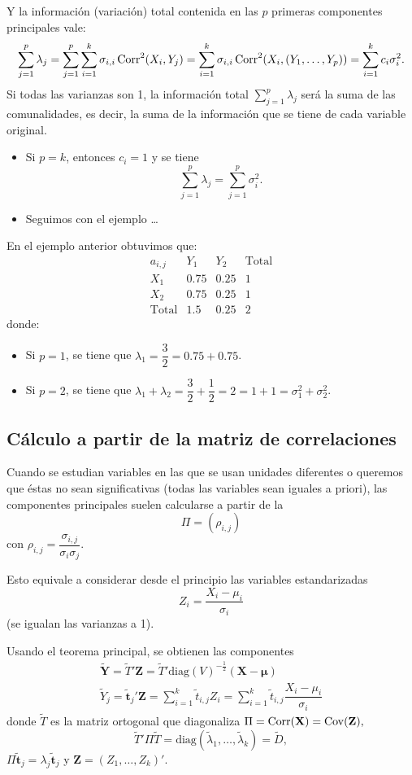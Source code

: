 Y la información (variación) total contenida en las $p$ primeras componentes principales vale: \[ \sum_{j=1}^{p}\lambda_j=\sum_{j=1}^{p}\sum_{i=1}^{k}\sigma_{i,i}\operatorname{Corr}^2(X_i,Y_j)=\sum_{i=1}^{k}\sigma_{i,i}\operatorname{Corr}^2(X_i,(Y_1,\dots,Y_p))=\sum_{i=1}^{k}c_i\sigma_i^2. \]
Si todas las varianzas son 1, la información total $\sum_{j=1}^{p}\lambda_j$ será la suma de las comunalidades, es decir, la suma de la información que se tiene de cada variable original.
\begin{itemize}
	\item Si $p=k$, entonces $c_i=1$ y se tiene \[ \sum_{j=1}^{p}\lambda_j=\sum_{j=1}^{p}\sigma_i^2. \]
\end{itemize}
\begin{itemize}[label=\color{red}\textbullet, leftmargin=*]
	\item \color{lightblue}Seguimos con el ejemplo \dots
\end{itemize}
En el ejemplo anterior obtuvimos que: \[ \begin{array}{c|c|c|c}
	a_{i,j} & Y_1 & Y_2 & \text{Total}\\ \hline
	X_1 & 0.75 & 0.25 & 1\\ \hline
	X_2 & 0.75 & 0.25 & 1\\ \hline
	\text{Total} & 1.5 & 0.25 & 2
\end{array} \]donde:
\begin{itemize}
	\item Si $p=1$, se tiene que $\lambda_1=\dfrac{3}{2}=0.75+0.75$.
	\item Si $p=2$, se tiene que $\lambda_1+\lambda_2=\dfrac{3}{2}+\dfrac{1}{2}=2=1+1=\sigma_1^2+\sigma_2^2$.
\end{itemize}
\subsection{Cálculo a partir de la matriz de correlaciones}
Cuando se estudian variables en las que se usan unidades diferentes o queremos que éstas no sean significativas (todas las variables sean iguales a priori), las componentes principales suelen calcularse a partir de la  \[ \Pi=(\rho_{i,j}) \]con $\rho_{i,j}=\dfrac{\sigma_{i,j}}{\sigma_i\sigma_j}$.

Esto equivale a considerar desde el principio las variables estandarizadas \[ Z_i=\dfrac{X_i-\mu_i}{\sigma_i} \](se igualan las varianzas a 1).

Usando el teorema principal, se obtienen las componentes \[ \begin{array}{c}
	\mathbf{\tilde{Y}}=\tilde{T}'\mathbf{Z}=\tilde{T}'\mathrm{diag}(V)^{-\frac{1}{2}}(\mathbf{X-\mu})\\
	\tilde{Y}_j=\mathbf{\tilde{t}}_j'\mathbf{Z}=\sum_{i=1}^{k}\tilde{t}_{i,j}Z_i=\sum_{i=1}^{k}\tilde{t}_{i,j}\dfrac{X_i-\mu_i}{\sigma_i}
\end{array} \]donde $\tilde{T}$ es la matriz ortogonal que diagonaliza $\Pi=\operatorname{Corr}(\mathbf{X})=\operatorname{Cov}(\mathbf{Z}),$ \[ \tilde{T}'\Pi\tilde{T}=\mathrm{diag}(\tilde{\lambda}_1,\dots,\tilde{\lambda}_k)=\tilde{D}, \]$\Pi\mathbf{\tilde{t}}_j=\lambda_j\mathbf{\tilde{t}}_j$ y $\mathbf{Z}=(Z_1,\dots,Z_k)'$.

